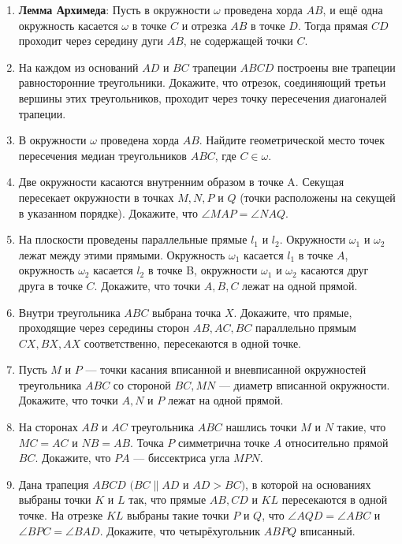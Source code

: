 \documentclass{article}
\begin{document}
\begin{enumerate}[label*=\protect\fbox{\arabic{enumi}}]
\item \textbf{Лемма Архимеда}: Пусть в окружности $\omega$ проведена хорда $AB$, и ещё одна окружность касается $\omega$ в точке $C$ и отрезка $AB$ в точке $D$. Тогда прямая $CD$ проходит через середину дуги $AB$, не содержащей точки $C$. 

\item На каждом из оснований $AD$ и $BC$ трапеции $ABCD$ построены вне трапеции равносторонние треугольники. Докажите, что отрезок, соединяющий третьи вершины этих треугольников, проходит через точку пересечения диагоналей трапеции.

\item В окружности $\omega$ проведена хорда $AB$. Найдите геометрической место точек пересечения медиан треугольников $ABC$, где $C\in \omega$.

\item Две окружности касаются внутренним образом в точке A. Секущая пересекает окружности в точках $M, N, P$ и $Q$ (точки расположены на секущей в указанном порядке). Докажите, что $\angle MAP=\angle NAQ$.

\item На плоскости проведены параллельные прямые $l_1$ и $l_2$. Окружности $\omega_1$ и $\omega_2$ лежат между этими прямыми. Окружность $\omega_1$ касается $l_1$ в точке $A$, окружность $\omega_2$ касается $l_2$ в точке B, окружности $\omega_1$ и $\omega_2$ касаются друг друга в точке $C$. Докажите, что точки $A, B, C$ лежат на одной прямой.


\item Внутри треугольника $ABC$ выбрана точка $X$. Докажите, что прямые, проходящие через середины сторон $AB, AC, BC$ параллельно прямым $CX, BX, AX$ соответственно, пересекаются в одной точке.

\item Пусть $M$ и $P$ — точки касания вписанной и вневписанной окружностей треугольника $ABC$ со стороной $BC, MN$ — диаметр вписанной окружности. Докажите, что точки $A, N$ и $P$ лежат на одной прямой.

\item На сторонах $AB$ и $AC$ треугольника $ABC$ нашлись точки $M$ и $N$ такие, что $MC=AC$ и $NB=AB$. Точка $P$ симметрична точке $A$ относительно прямой $BC$. Докажите, что $PA$ — биссектриса угла $MPN$.

\item Дана трапеция $ABCD$ $(BC \parallel AD$ и $AD>BC)$, в которой на основаниях выбраны точки $K$ и $L$ так, что прямые $AB, CD$ и $KL$ пересекаются в одной точке. На отрезке $KL$ выбраны такие точки $P$ и $Q$, что $\angle AQD=\angle ABC$ и $\angle BPC=\angle BAD$. Докажите, что четырёхугольник $ABPQ$ вписанный.


\end{enumerate}
\end{document}
